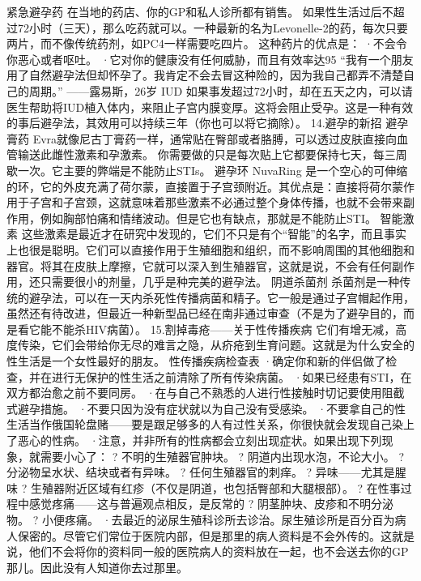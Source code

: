 \documentclass[12pt,UTF8]{ctexbook}
\begin{document}
紧急避孕药
在当地的药店、你的GP和私人诊所都有销售。
如果性生活过后不超过72小时（三天），那么吃药就可以。一种最新的名为Levonelle-2的药，每次只要两片，而不像传统药剂，如PC4一样需要吃四片。
这种药片的优点是：
·不会令你恶心或者呕吐。
·它对你的健康没有任何威胁，而且有效率达95%
“我有一个朋友用了自然避孕法但却怀孕了。我肯定不会去冒这种险的，因为我自己都弄不清楚自己的周期。”
——露易斯，26岁
IUD
如果事发超过72小时，却在五天之内，可以请医生帮助将IUD植入体内，来阻止子宫内膜变厚。这将会阻止受孕。这是一种有效的事后避孕法，其效用可以持续三年（你也可以将它摘除）。
14.避孕的新招
避孕膏药
Evra就像尼古丁膏药一样，通常贴在臀部或者胳膊，可以透过皮肤直接向血管输送此雌性激素和孕激素。
你需要做的只是每次贴上它都要保持七天，每三周歇一次。它主要的弊端是不能防止STIs。
避孕环
NuvaRing 是一个空心的可伸缩的环，它的外皮充满了荷尔蒙，直接置于子宫颈附近。其优点是：直接将荷尔蒙作用于子宫和子宫颈，这就意味着那些激素不必通过整个身体传播，也就不会带来副作用，例如胸部怕痛和情绪波动。但是它也有缺点，那就是不能防止STI。
智能激素
这些激素是最近才在研究中发现的，它们不只是有个“智能”的名字，而且事实上也很是聪明。它们可以直接作用于生殖细胞和组织，而不影响周围的其他细胞和器官。将其在皮肤上摩擦，它就可以深入到生殖器官，这就是说，不会有任何副作用，还只需要很小的剂量，几乎是种完美的避孕法。
阴道杀菌剂
杀菌剂是一种传统的避孕法，可以在一天内杀死性传播病菌和精子。它一般是通过子宫帽起作用，虽然还有待改进，但最近一种新型品已经在南非通过审查（不是为了避孕目的，而是看它能不能杀HIV病菌）。
15.割掉毒疮——关于性传播疾病
它们有增无减，高度传染，它们会带给你无尽的难言之隐，从疥疮到生育问题。这就是为什么安全的性生活是一个女性最好的朋友。
性传播疾病检查表
·确定你和新的伴侣做了检查，并在进行无保护的性生活之前清除了所有传染病菌。
·如果已经患有STI，在双方都治愈之前不要同房。
·在与自己不熟悉的人进行性接触时切记要使用阻截式避孕措施。
·不要只因为没有症状就以为自己没有受感染。
·不要拿自己的性生活当作俄国轮盘赌——要是跟足够多的人有过性关系，你很快就会发现自己染上了恶心的性病。
·注意，并非所有的性病都会立刻出现症状。如果出现下列现象，就需要小心了：
? 不明的生殖器官肿块。
? 阴道内出现水泡，不论大小。
? 分泌物呈水状、结块或者有异味。
? 任何生殖器官的刺痒。
? 异味——尤其是腥味
? 生殖器附近区域有红疹（不仅是阴道，也包括臀部和大腿根部）。
? 在性事过程中感觉疼痛——这与普遍观点相反，是反常的
? 阴茎肿块、皮疹和不明分泌物。
? 小便疼痛。
·去最近的泌尿生殖科诊所去诊治。尿生殖诊所是百分百为病人保密的。尽管它们常位于医院内部，但是那里的病人资料是不会外传的。这就是说，他们不会将你的资料同一般的医院病人的资料放在一起，也不会送去你的GP那儿。因此没有人知道你去过那里。
\end{document}
